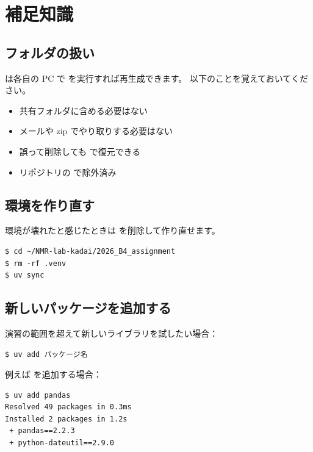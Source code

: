\chapter{補足知識}

\section{ フォルダの扱い}

 は各自の PC で  を実行すれば再生成できます。
以下のことを覚えておいてください。

\begin{itemize}
  \item 共有フォルダに含める必要はない
  \item メールや zip でやり取りする必要はない
  \item 誤って削除しても  で復元できる
  \item リポジトリの  で除外済み
\end{itemize}

\section{環境を作り直す}

環境が壊れたと感じたときは  を削除して作り直せます。

\begin{wslbox}[環境の再作成]
\begin{lstlisting}[style=bash]
$ cd ~/NMR-lab-kadai/2026_B4_assignment
$ rm -rf .venv
$ uv sync
\end{lstlisting}
\end{wslbox}

\section{新しいパッケージを追加する}

演習の範囲を超えて新しいライブラリを試したい場合：

\begin{wslbox}[パッケージの追加]
\begin{lstlisting}[style=bash]
$ uv add パッケージ名
\end{lstlisting}
\end{wslbox}

例えば  を追加する場合：

\begin{wslbox}
\begin{lstlisting}[style=bash]
$ uv add pandas
Resolved 49 packages in 0.3ms
Installed 2 packages in 1.2s
 + pandas==2.2.3
 + python-dateutil==2.9.0
\end{lstlisting}
\end{wslbox}

